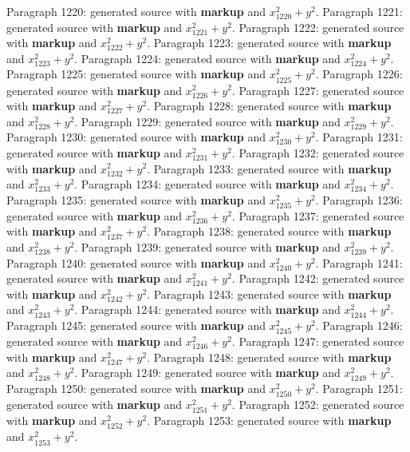 \documentclass{article}
\begin{document}
Paragraph 1220: generated source with \textbf{markup} and $x_{1220}^2 + y^2$.
Paragraph 1221: generated source with \textbf{markup} and $x_{1221}^2 + y^2$.
Paragraph 1222: generated source with \textbf{markup} and $x_{1222}^2 + y^2$.
Paragraph 1223: generated source with \textbf{markup} and $x_{1223}^2 + y^2$.
Paragraph 1224: generated source with \textbf{markup} and $x_{1224}^2 + y^2$.
Paragraph 1225: generated source with \textbf{markup} and $x_{1225}^2 + y^2$.
Paragraph 1226: generated source with \textbf{markup} and $x_{1226}^2 + y^2$.
Paragraph 1227: generated source with \textbf{markup} and $x_{1227}^2 + y^2$.
Paragraph 1228: generated source with \textbf{markup} and $x_{1228}^2 + y^2$.
Paragraph 1229: generated source with \textbf{markup} and $x_{1229}^2 + y^2$.
Paragraph 1230: generated source with \textbf{markup} and $x_{1230}^2 + y^2$.
Paragraph 1231: generated source with \textbf{markup} and $x_{1231}^2 + y^2$.
Paragraph 1232: generated source with \textbf{markup} and $x_{1232}^2 + y^2$.
Paragraph 1233: generated source with \textbf{markup} and $x_{1233}^2 + y^2$.
Paragraph 1234: generated source with \textbf{markup} and $x_{1234}^2 + y^2$.
Paragraph 1235: generated source with \textbf{markup} and $x_{1235}^2 + y^2$.
Paragraph 1236: generated source with \textbf{markup} and $x_{1236}^2 + y^2$.
Paragraph 1237: generated source with \textbf{markup} and $x_{1237}^2 + y^2$.
Paragraph 1238: generated source with \textbf{markup} and $x_{1238}^2 + y^2$.
Paragraph 1239: generated source with \textbf{markup} and $x_{1239}^2 + y^2$.
Paragraph 1240: generated source with \textbf{markup} and $x_{1240}^2 + y^2$.
Paragraph 1241: generated source with \textbf{markup} and $x_{1241}^2 + y^2$.
Paragraph 1242: generated source with \textbf{markup} and $x_{1242}^2 + y^2$.
Paragraph 1243: generated source with \textbf{markup} and $x_{1243}^2 + y^2$.
Paragraph 1244: generated source with \textbf{markup} and $x_{1244}^2 + y^2$.
Paragraph 1245: generated source with \textbf{markup} and $x_{1245}^2 + y^2$.
Paragraph 1246: generated source with \textbf{markup} and $x_{1246}^2 + y^2$.
Paragraph 1247: generated source with \textbf{markup} and $x_{1247}^2 + y^2$.
Paragraph 1248: generated source with \textbf{markup} and $x_{1248}^2 + y^2$.
Paragraph 1249: generated source with \textbf{markup} and $x_{1249}^2 + y^2$.
Paragraph 1250: generated source with \textbf{markup} and $x_{1250}^2 + y^2$.
Paragraph 1251: generated source with \textbf{markup} and $x_{1251}^2 + y^2$.
Paragraph 1252: generated source with \textbf{markup} and $x_{1252}^2 + y^2$.
Paragraph 1253: generated source with \textbf{markup} and $x_{1253}^2 + y^2$.
\end{document}
